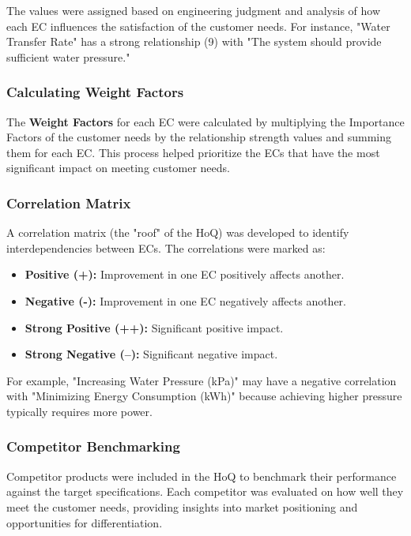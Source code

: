 \documentclass[12pt]{report}
\begin{document}
The values were assigned based on engineering judgment and analysis of how each EC influences the satisfaction of the customer needs. For instance, "Water Transfer Rate" has a strong relationship (9) with "The system should provide sufficient water pressure."

\subsubsection{Calculating Weight Factors}

The \textbf{Weight Factors} for each EC were calculated by multiplying the Importance Factors of the customer needs by the relationship strength values and summing them for each EC. This process helped prioritize the ECs that have the most significant impact on meeting customer needs.

\subsubsection{Correlation Matrix}

A correlation matrix (the "roof" of the HoQ) was developed to identify interdependencies between ECs. The correlations were marked as:

\begin{itemize}
    \item \textbf{Positive (+):} Improvement in one EC positively affects another.
    \item \textbf{Negative (-):} Improvement in one EC negatively affects another.
    \item \textbf{Strong Positive (++):} Significant positive impact.
    \item \textbf{Strong Negative (--):} Significant negative impact.
\end{itemize}

For example, "Increasing Water Pressure (kPa)" may have a negative correlation with "Minimizing Energy Consumption (kWh)" because achieving higher pressure typically requires more power.

\subsubsection{Competitor Benchmarking}

Competitor products were included in the HoQ to benchmark their performance against the target specifications. Each competitor was evaluated on how well they meet the customer needs, providing insights into market positioning and opportunities for differentiation.
\end{document}
